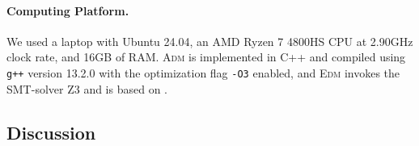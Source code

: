 
\paragraph*{Computing Platform.}
We used a laptop with Ubuntu 24.04, an AMD Ryzen 7 4800HS CPU at 2.90GHz clock rate, and 16GB of RAM.
\textsc{Adm} is implemented in C++ and compiled using \texttt{g++} version 13.2.0 with the optimization flag \texttt{-O3} enabled, and \textsc{Edm} invokes the SMT-solver Z3 \cite{MouraB08} and is based on \cite{MomtazAB23}.

\subsection{Discussion}

